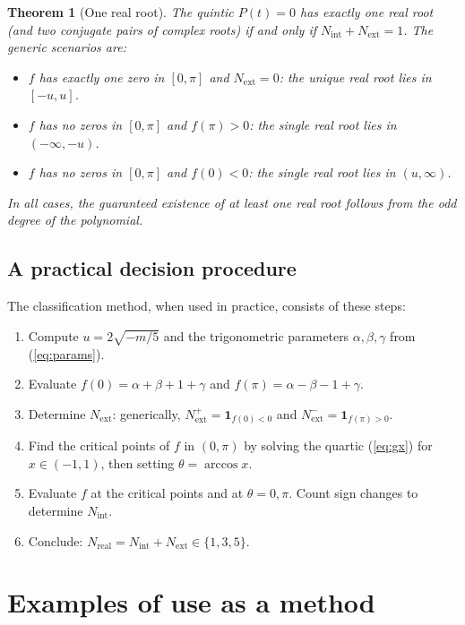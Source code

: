 \documentclass[12pt]{article}
\newtheorem{theorem}{Theorem}
\theoremstyle{definition}
\theoremstyle{remark}
\begin{document}
\begin{theorem}[One real root]\label{thm:one}
The quintic $P(t) = 0$ has exactly one real root (and two conjugate pairs of complex roots) if and only if $N_{\mathrm{int}} + N_{\mathrm{ext}} = 1$. The generic scenarios are:
\begin{itemize}
\item[(a)] $f$ has exactly one zero in $[0,\pi]$ and $N_{\mathrm{ext}} = 0$: the unique real root lies in $[-u,u]$.
\item[(b)] $f$ has no zeros in $[0,\pi]$ and $f(\pi) > 0$: the single real root lies in $(-\infty, -u)$.
\item[(c)] $f$ has no zeros in $[0,\pi]$ and $f(0) < 0$: the single real root lies in $(u, \infty)$.
\end{itemize}
In all cases, the guaranteed existence of at least one real root follows from the odd degree of the polynomial.
\end{theorem}

\subsection{A practical decision procedure}

The classification method, when used in practice, consists of these steps:
\begin{enumerate}
\item Compute $u = 2\sqrt{-m/5}$ and the trigonometric parameters $\alpha, \beta, \gamma$ from (\ref{eq:params}).
\item Evaluate $f(0) = \alpha + \beta + 1 + \gamma$ and $f(\pi) = \alpha - \beta - 1 + \gamma$.
\item Determine $N_{\mathrm{ext}}$: generically, $N_{\mathrm{ext}}^{+} = \mathbf{1}_{f(0)<0}$ and $N_{\mathrm{ext}}^{-} = \mathbf{1}_{f(\pi)>0}$.
\item Find the critical points of $f$ in $(0,\pi)$ by solving the quartic (\ref{eq:gx}) for $x \in (-1,1)$, then setting $\theta = \arccos x$.
\item Evaluate $f$ at the critical points and at $\theta = 0, \pi$. Count sign changes to determine $N_{\mathrm{int}}$.
\item Conclude: $N_{\mathrm{real}} = N_{\mathrm{int}} + N_{\mathrm{ext}} \in \{1, 3, 5\}$.
\end{enumerate}

\section{Examples of use as a method}
\end{document}
